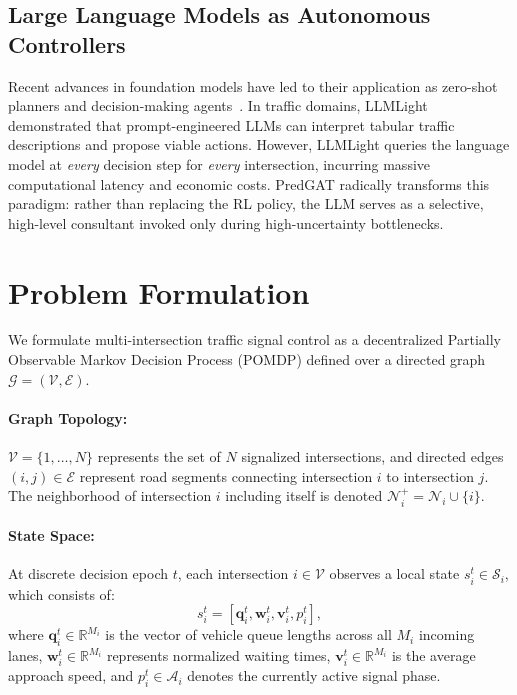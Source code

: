 \documentclass[11pt,a4paper]{article}
\begin{document}
\subsection{Large Language Models as Autonomous Controllers}
Recent advances in foundation models have led to their application as zero-shot planners and decision-making agents~\cite{wang2024survey}. In traffic domains, LLMLight~\cite{lai2024llmlight} demonstrated that prompt-engineered LLMs can interpret tabular traffic descriptions and propose viable actions. However, LLMLight queries the language model at \textit{every} decision step for \textit{every} intersection, incurring massive computational latency and economic costs. PredGAT radically transforms this paradigm: rather than replacing the RL policy, the LLM serves as a selective, high-level consultant invoked only during high-uncertainty bottlenecks.

\section{Problem Formulation}
\label{sec:prelim}

We formulate multi-intersection traffic signal control as a decentralized Partially Observable Markov Decision Process (POMDP) defined over a directed graph $\mathcal{G} = (\mathcal{V}, \mathcal{E})$.

\paragraph{Graph Topology:} $\mathcal{V} = \{1, \dots, N\}$ represents the set of $N$ signalized intersections, and directed edges $(i, j) \in \mathcal{E}$ represent road segments connecting intersection $i$ to intersection $j$. The neighborhood of intersection $i$ including itself is denoted $\mathcal{N}_i^+ = \mathcal{N}_i \cup \{i\}$.

\paragraph{State Space:} At discrete decision epoch $t$, each intersection $i \in \mathcal{V}$ observes a local state $s_i^t \in \mathcal{S}_i$, which consists of:
\begin{equation}
    s_i^t = \left[ \mathbf{q}_i^t, \mathbf{w}_i^t, \mathbf{v}_i^t, p_i^t \right],
\end{equation}
where $\mathbf{q}_i^t \in \mathbb{R}^{M_i}$ is the vector of vehicle queue lengths across all $M_i$ incoming lanes, $\mathbf{w}_i^t \in \mathbb{R}^{M_i}$ represents normalized waiting times, $\mathbf{v}_i^t \in \mathbb{R}^{M_i}$ is the average approach speed, and $p_i^t \in \mathcal{A}_i$ denotes the currently active signal phase.
\end{document}
